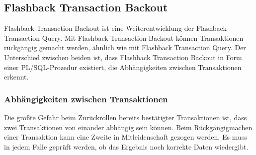       \subsection{Flashback Transaction Backout}
        Flashback Transaction Backout ist eine Weiterentwicklung der Flashback Transaction Query. Mit Flashback Transaction Backout k\"onnen Transaktionen r\"uckg\"angig gemacht werden, \"ahnlich wie mit Flashback Transaction Query. Der Unterschied zwischen beiden ist, dass Flashback Transaction Backout in Form einer PL/SQL-Prozedur existiert, die Abh\"angigkeiten zwischen Transaktionen erkennt.
        \subsubsection{Abh\"angigkeiten zwischen Transaktionen}
          Die gr\"o\ss{}te Gefahr beim Zur\"uckrollen bereits best\"atigter Transaktionen ist, dass zwei Transaktionen von einander abh\"angig sein k\"onnen. Beim R\"uckg\"angigmachen einer Transaktion kann eine Zweite in Mitleidenschaft gezogen werden. Es muss in jedem Falle gepr\"uft werden, ob das Ergebnis noch korrekte Daten wiedergibt.

